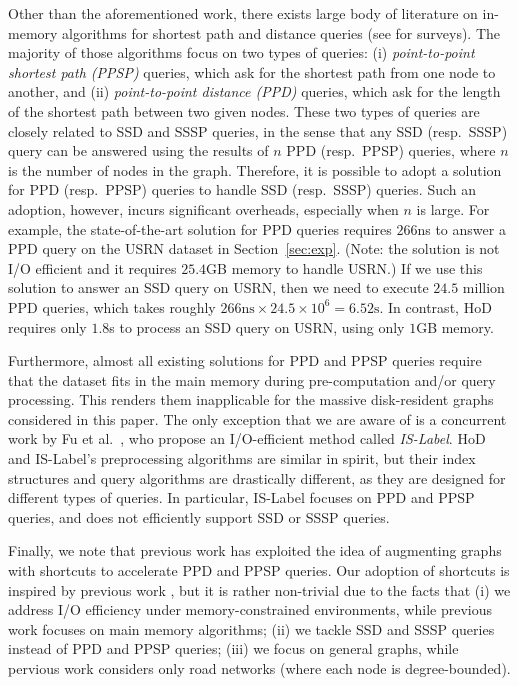 \documentclass{sig-alternate}
\begin{document}
\begin{sloppy}

Other than the aforementioned work, there exists large body of literature on in-memory algorithms for shortest path and distance queries (see \cite{s12,dss09,zmxl13,tsp11} for surveys). The majority of those algorithms focus on two types of queries: (i) {\em point-to-point shortest path (PPSP)} queries, which ask for the shortest path from one node to another, and (ii) {\em point-to-point distance (PPD)} queries, which ask for the length of the shortest path between two given nodes. These two types of queries are closely related to SSD and SSSP queries, in the sense that any SSD (resp.\ SSSP) query can be answered using the results of $n$ PPD (resp.\ PPSP) queries, where $n$ is the number of nodes in the graph. Therefore, it is possible to adopt a solution for PPD (resp.\ PPSP) queries to handle SSD (resp.\ SSSP) queries. Such an adoption, however, incurs significant overheads, especially when $n$ is large. For example, the state-of-the-art solution \cite{adgw11} for PPD queries requires $266$ns to answer a PPD query on the USRN dataset in Section~\ref{sec:exp}. (Note: the solution is not I/O efficient and it requires $25.4$GB memory to handle USRN.) If we use this solution to answer an SSD query on USRN, then we need to execute $24.5$ million PPD queries, which takes roughly $266\textrm{ns} \times 24.5 \times 10^6 = 6.52\textrm{s}$. In contrast, HoD requires only $1.8$s to process an SSD query on USRN, using only $1$GB memory.

Furthermore, almost all existing solutions for PPD and PPSP queries require that the dataset fits in the main memory during pre-computation and/or query processing. This renders them inapplicable for the massive disk-resident graphs considered in this paper. The only exception that we are aware of is a concurrent work by Fu et al.\ \cite{fwcc13}, who propose an I/O-efficient method called {\em IS-Label}. HoD and IS-Label's preprocessing algorithms are similar in spirit, but their index structures and query algorithms are drastically different, as they are designed for different types of queries. In particular, IS-Label focuses on PPD and PPSP queries, and does not efficiently support SSD or SSSP queries.

Finally, we note that previous work \cite{ss05,gss08,dss09} has exploited the idea of augmenting graphs with shortcuts to accelerate PPD and PPSP queries. Our adoption of shortcuts is inspired by previous work \cite{ss05,gss08,dss09}, but it is rather non-trivial due to the facts that (i) we address I/O efficiency under memory-constrained environments, while previous work \cite{ss05,gss08,dss09} focuses on main memory algorithms; (ii) we tackle SSD and SSSP queries instead of PPD and PPSP queries; (iii) we focus on general graphs, while pervious work \cite{ss05,gss08,dss09} considers only road networks (where each node is degree-bounded).




\end{sloppy}
\end{document}
